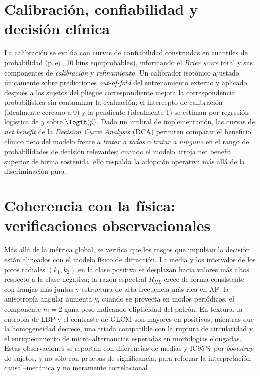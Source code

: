 \section*{Calibración, confiabilidad y decisión clínica}
La calibración se evalúa con curvas de confiabilidad construidas en cuantiles de probabilidad (p.\,ej., 10 bins equiprobables), informando el \emph{Brier score} total y sus componentes de \emph{calibración} y \emph{refinamiento}. Un calibrador isotónico ajustado únicamente sobre predicciones \emph{out-of-fold} del entrenamiento externo y aplicado después a los sujetos del pliegue correspondiente mejora la correspondencia probabilística sin contaminar la evaluación; el intercepto de calibración (idealmente cercano a 0) y la pendiente (idealmente 1) se estiman por regresión logística de $y$ sobre $\logit(\hat{p})$. Dado un umbral de implementación, las curvas de \emph{net benefit} de la \emph{Decision Curve Analysis} (DCA) permiten comparar el beneficio clínico neto del modelo frente a \emph{tratar a todos} o \emph{tratar a ninguno} en el rango de probabilidades de decisión relevantes; cuando el modelo arroja net benefit superior de forma sostenida, ello respalda la adopción operativa más allá de la discriminación pura \cite{Vickers2006MedDec}.

\section*{Coherencia con la física: verificaciones observacionales}
Más allá de la métrica global, se verifica que los rasgos que impulsan la decisión están alineados con el modelo físico de difracción. La media y los intervalos de los picos radiales $(k_1,k_2)$ en la clase positiva se desplazan hacia valores más altos respecto a la clase negativa; la razón espectral $R_{HL}$ crece de forma consistente con franjas más juntas y estructura de alta frecuencia más rica en AF; la anisotropía angular aumenta y, cuando se proyecta en modos periódicos, el componente $m{=}2$ gana peso indicando elipticidad del patrón. En textura, la entropía de LBP y el contraste de GLCM son mayores en positivos, mientras que la homogeneidad decrece, una triada compatible con la ruptura de circularidad y el enriquecimiento de micro–alternancias esperadas en morfologías elongadas. Estas observaciones se reportan con diferencias de medias y IC95\,\% por \emph{bootstrap} de sujetos, y no sólo con pruebas de significancia, para reforzar la interpretación causal–mecánica y no meramente correlacional \cite{Kiani2022TextureSurvey,Chen2022Photonics}.

